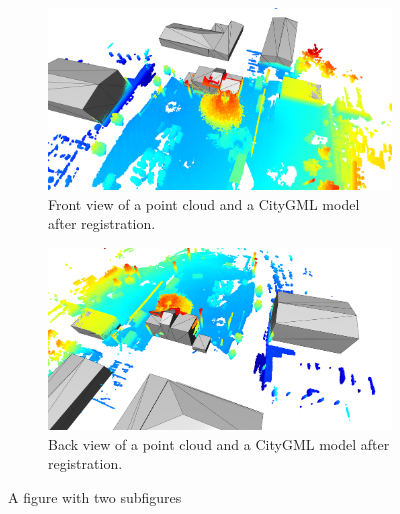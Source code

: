         \begin{figure}[H]
            \centering
            \begin{subfigure}{1\textwidth}
                \centering
                \includegraphics[scale=0.2]{images/solution_images/final_front.png}
                \caption{Front view of a point cloud and a CityGML model after registration.}
                \label{fig:final_front_model}
            \end{subfigure}
            \hfill
            \begin{subfigure}{1\textwidth}
                \centering
                \includegraphics[scale=0.2]{images/solution_images/final_back.png}
                \caption{Back view of a point cloud and a CityGML model after registration.}
                \label{fig:final_back_model}
            \end{subfigure}
            \caption{A figure with two subfigures}
            \label{fig:final_CityGML}
        \end{figure}


